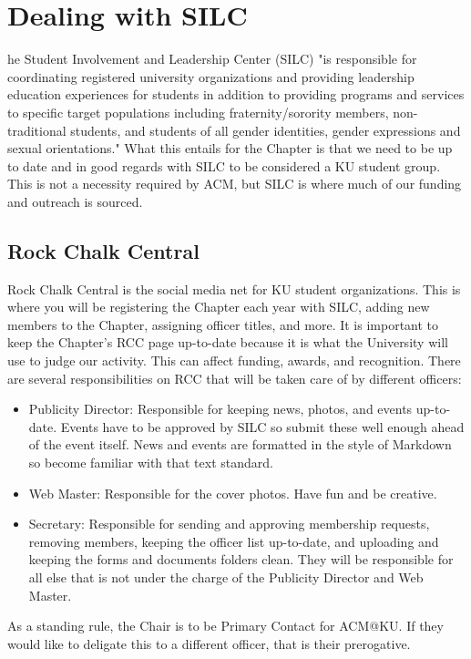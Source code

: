 %
%
\let\textcircled=\pgftextcircled
\chapter{Dealing with SILC}
\label{chap:silc}

he Student Involvement and Leadership Center (SILC) "is responsible for coordinating registered university organizations and providing leadership education experiences for students in addition to providing programs and services to specific target populations including fraternity/sorority members, non-traditional students, and students of all gender identities, gender expressions and sexual orientations." What this entails for the Chapter is that we need to be up to date and in good regards with SILC to be considered a KU student group. This is not a necessity required by ACM, but SILC is where much of our funding and outreach is sourced.


\section{Rock Chalk Central}
\label{sec:sec01}

Rock Chalk Central is the social media net for KU student organizations. This is where you will be registering the Chapter each year with SILC, adding new members to the Chapter, assigning officer titles, and more. It is important to keep the Chapter's RCC page up-to-date because it is what the University will use to judge our activity. This can affect funding, awards, and recognition.
There are several responsibilities on RCC that will be taken care of by different officers:
\begin{itemize}
	\item Publicity Director: Responsible for keeping news, photos, and events up-to-date. Events have to be approved by SILC so submit these well enough ahead of the event itself. News and events are formatted in the style of Markdown so become familiar with that text standard.
	\item Web Master: Responsible for the cover photos. Have fun and be creative.
	\item Secretary: Responsible for sending and approving membership requests, removing members, keeping the officer list up-to-date, and uploading and keeping the forms and documents folders clean. They will be responsible for all else that is not under the charge of the Publicity Director and Web Master.
\end{itemize}
As a standing rule, the Chair is to be Primary Contact for ACM@KU. If they would like to deligate this to a different officer, that is their prerogative. 

